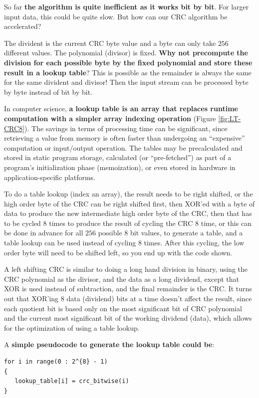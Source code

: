 \documentclass[fleqn]{IEEEtran}
\begin{document}
So far \textbf{the algorithm is quite inefficient as it works bit by bit}. 
For larger input data, this could be quite slow. But how can our CRC algorithm 
be accelerated?

The divident is the current CRC byte value and a byte can only take $256$ 
different values. The polynomial (divisor) is fixed. \textbf{Why not precompute 
the division for each possible byte by the fixed polynomial and store these 
result in a lookup table}? This is possible as the remainder is always the same 
for the same divident and divisor! Then the input stream can be processed byte 
by byte instead of bit by bit.

In computer science, \textbf{a lookup table is an array that replaces runtime 
computation with a simpler array indexing operation} (Figure \ref{fig:LT-CRC8}). 
The savings in terms of processing time can be significant, since retrieving a 
value from memory is often faster than undergoing an “expensive” computation 
or input/output operation. The tables may be precalculated and stored in 
static program storage, calculated (or “pre-fetched”) as part of a program's 
initialization phase (memoization), or even stored in hardware in 
application-specific platforms.

To do a table lookup (index an array), the result needs to be right shifted, or 
the high order byte of the CRC can be right shifted first, then XOR'ed with a 
byte of data to produce the new intermediate high order byte of the CRC, then 
that has to be cycled $8$ times to produce the result of cycling the CRC $8$ 
time, or this can be done in advance for all $256$ possible $8$ bit values, 
to generate a table, and a table lookup can be used instead of cycling $8$ 
times. After this cycling, the low order byte will need to be shifted left, 
so you end up with the code shown.

A left shifting CRC is similar to doing a long hand division in binary, using 
the CRC polynomial as the divisor, and the data as a long dividend, except that 
XOR is used instead of subtraction, and the final remainder is the CRC. It turns 
out that XOR'ing $8$ data (dividend) bits at a time doesn't affect the result, 
since each quotient bit is based only on the most significant bit of CRC 
polynomial and the current most significant bit of the working dividend (data), 
which allows for the optimization of using a table lookup.

A \textbf{simple pseudocode to generate the lookup table could be}:
\begin{verbatim}
for i in range(0 : 2^{8} - 1)
{
   lookup_table[i] = crc_bitwise(i)
}  
\end{verbatim}
\end{document}
